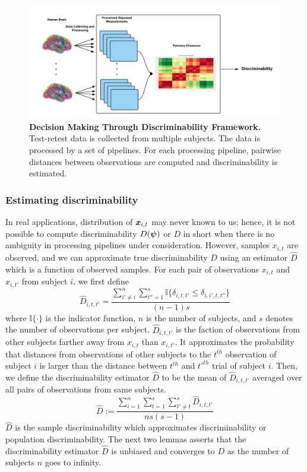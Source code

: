 \documentclass{article}
\begin{document}
\begin{figure}[ht!]
	\includegraphics[width=\linewidth]{../Figs/flow_chart.png}
	\caption{{\bf Decision Making Through Discriminability Framework.} Test-retest data is collected from multiple subjects. The data is processed by a set of pipelines. For each processing pipeline, pairwise distances between observations are computed and discriminability is estimated. }
	\label{fig:fc}
\end{figure}

\subsubsection{Estimating discriminability}
In real applications, distribution of $\boldsymbol{x}_{i,t}$ may never known to us; hence, it is not possible to compute discriminability $D(\boldsymbol{\psi})$ or $D$ in short when there is no ambiguity in processing pipelines under consideration. However, samples $x_{i,t}$ are observed, and we can approximate true discriminability $D$ using an estimator $\hat{D}$ which is a function of observed samples. For each pair of observations $x_{i,t}$ and $x_{i,t'}$ from subject $i$, we first define
\[ \hat{D}_{i,t,t'} = \frac{\sum\limits_{i' \neq i}^{n} \sum\limits_{t''=1}^{s} \mathbb{I}\{\delta_{i,t,t'} \leq \delta_{i,i',t,t''} \} }{(n-1)s}\]
where $\mathbb{I}\{ \cdot \} $ is the indicator function, $n$ is the number of subjects, and $s$ denotes the number of observations per subject. $\hat{D}_{i,t,t'}$ is the faction of observations from other subjects farther away from $x_{i,t}$ than $x_{i,t'}$. It approximates the probability that distances from observations of other subjects to the $t^{th}$ observation of subject $i$ is larger than the distance between $t^{th}$ and $t'^{th}$ trial of subject $i$. Then, we define the discriminability estimator $\hat{D}$ to be the mean of $\hat{D}_{i,t,t'}$ averaged over all pairs of observations from same subjects.
\[ \hat{D} := \frac{\sum\limits_{i=1}^{n} \sum\limits_{t=1}^{s}  \sum\limits_{t' \neq t}^{s} \hat{D}_{i,t,t'}}{ns(s-1)} \]
$\hat{D}$ is the sample discriminability which approximates discriminability or population discriminability. The next two lemmas asserts that the discriminability estimator $\hat{D}$ is unbiased and converges to $D$ as the number of subjects $n$ goes to infinity.
\end{document}

